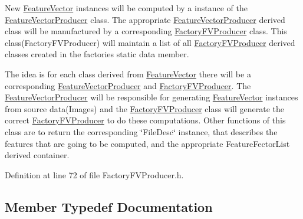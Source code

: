New \hyperlink{class_k_k_m_l_l_1_1_feature_vector}{Feature\+Vector} instances will be computed by a instance of the \textquotesingle{}\hyperlink{class_k_k_m_l_l_1_1_feature_vector_producer}{Feature\+Vector\+Producer}\textquotesingle{} class. The appropriate \textquotesingle{}\hyperlink{class_k_k_m_l_l_1_1_feature_vector_producer}{Feature\+Vector\+Producer}\textquotesingle{} derived class will be manufactured by a corresponding \textquotesingle{}\hyperlink{class_k_k_m_l_l_1_1_factory_f_v_producer}{Factory\+F\+V\+Producer}\textquotesingle{} class. This class(\+Factory\+F\+V\+Producer) will maintain a list of all \textquotesingle{}\hyperlink{class_k_k_m_l_l_1_1_factory_f_v_producer}{Factory\+F\+V\+Producer}\textquotesingle{} derived classes created in the \textquotesingle{}factories\textquotesingle{} static data member.

The idea is for each class derived from \hyperlink{class_k_k_m_l_l_1_1_feature_vector}{Feature\+Vector} there will be a corresponding \textquotesingle{}\hyperlink{class_k_k_m_l_l_1_1_feature_vector_producer}{Feature\+Vector\+Producer}\textquotesingle{} and \textquotesingle{}\hyperlink{class_k_k_m_l_l_1_1_factory_f_v_producer}{Factory\+F\+V\+Producer}\textquotesingle{}. The \textquotesingle{}\hyperlink{class_k_k_m_l_l_1_1_feature_vector_producer}{Feature\+Vector\+Producer}\textquotesingle{} will be responsible for generating \textquotesingle{}\hyperlink{class_k_k_m_l_l_1_1_feature_vector}{Feature\+Vector}\textquotesingle{} instances from source data(\+Images) and the \textquotesingle{}\hyperlink{class_k_k_m_l_l_1_1_factory_f_v_producer}{Factory\+F\+V\+Producer}\textquotesingle{} class will generate the correct \textquotesingle{}\hyperlink{class_k_k_m_l_l_1_1_factory_f_v_producer}{Factory\+F\+V\+Producer}\textquotesingle{} to do these computations. Other functions of this class are to return the corresponding \char`\"{}\+File\+Desc\char`\"{} instance, that describes the features that are going to be computed, and the appropriate \textquotesingle{}Feature\+Fector\+List\textquotesingle{} derived container. 

Definition at line 72 of file Factory\+F\+V\+Producer.\+h.



\subsection{Member Typedef Documentation}
